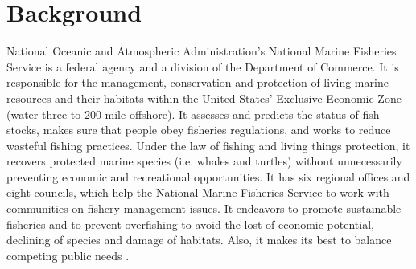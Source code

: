 \documentclass[12pt,letterpaper]{article}
\theoremstyle{definition}
\begin{document}
\section{Background} 
National Oceanic and Atmospheric Administration's National Marine Fisheries Service is a federal agency and a division of the Department of Commerce. It is responsible for the management, conservation and protection of living marine resources and their habitats within the United States' Exclusive Economic Zone (water three to 200 mile offshore). It assesses and predicts the status of fish stocks, makes sure that people obey fisheries regulations, and works to reduce wasteful fishing practices. Under the law of fishing and living things protection, it recovers protected marine species (i.e. whales and turtles) without unnecessarily preventing economic and recreational opportunities. It has six regional offices and eight councils, which help the National Marine Fisheries Service to work with communities on fishery management issues. It endeavors to promote sustainable fisheries and to prevent overfishing to avoid the lost of economic potential, declining of species and damage of habitats. Also, it makes its best to balance competing public needs \cite{NOAA}.
\end{document}
